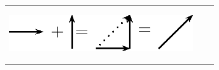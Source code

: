     \setlength\myfixedwidth{0pt}
    \setlength\mystarwidth{\mytableroom}
        \addtolength\mystarwidth{-\myfixedwidth}
        \divide{}
        
    
            
    
        \begin{center}
      
      \label{m38813*id188766}
      
    \noindent
      \tablelasttail{}
      \begin{xtabular*}{\mytablewidth}[t]{|p{10\mystarwidth}|p{10\mystarwidth}|p{10\mystarwidth}|}\hline
    
    
        
                  
    \setcounter{subfigure}{0}

\label{m38813*id188773}
    \begin{center}
    \label{m38813*id188773!!!underscore!!!media}\label{m38813*id188773!!!underscore!!!printimage}\includegraphics[width=300px]{col11305.imgs/m38813_PG11C1_026.png} %
        
      \vspace{2pt}
    \vspace{.1in}
    
    \end{center}



    \addtocounter{footnote}{-0}
    
                 &
    
    
        

\end{xtabular*}
\end{center}
